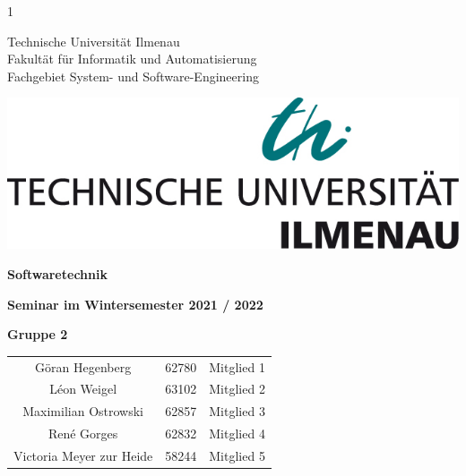1\begin{titlepage}
    
    \begin{minipage}[b]{0.625\textwidth}
      Technische Universität Ilmenau\\
      Fakultät für Informatik und Automatisierung\\
      Fachgebiet System- und Software-Engineering
    \end{minipage}%
    \hfill
    \begin{minipage}[b]{0.375\textwidth}
      \begin{flushright}
        \includegraphics[width=\textwidth]{tu_logo.jpg}
      \end{flushright}
    \end{minipage}
    \vspace*{12\baselineskip}
    
    \begin{centering}
    {\huge \textbf{Softwaretechnik}}\\
    \vspace*{1\baselineskip}
    
    {\large \textbf{Seminar im Wintersemester 2021 / 2022}}\\
    \vspace*{9\baselineskip}
    
    {\LARGE \textbf{Gruppe 2}}\\
    \vspace*{1\baselineskip}
    
    \begin{center}
        \large
        \begin{tabular}{ccc}
            Göran Hegenberg & 62780 & Mitglied 1 \\
            Léon Weigel & 63102 & Mitglied 2 \\
            Maximilian Ostrowski & 62857 & Mitglied 3 \\
            René Gorges & 62832 & Mitglied 4 \\
            Victoria Meyer zur Heide & 58244 & Mitglied 5 \\
        \end{tabular}
    \end{center}
    \end{centering}
    
    \restoregeometry
    \end{titlepage}
    
    
    
    \tableofcontents
    \thispagestyle{empty} %
    \pagebreak %